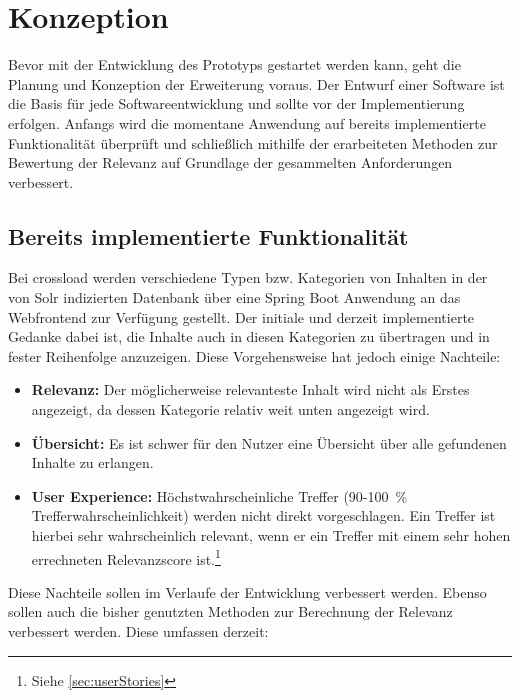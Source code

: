 \chapter{Konzeption}
\label{ch:conception}
Bevor mit der Entwicklung des Prototyps gestartet werden kann, geht die Planung und Konzeption der Erweiterung voraus.
Der Entwurf einer Software ist die Basis für jede Softwareentwicklung und sollte vor der Implementierung erfolgen.
Anfangs wird die momentane Anwendung auf bereits implementierte Funktionalität überprüft und schließlich mithilfe der erarbeiteten Methoden zur Bewertung der Relevanz auf Grundlage der gesammelten Anforderungen verbessert.

\section{Bereits implementierte Funktionalität}
\label{sec:implementedFunctionality}
Bei \gls{crossload} werden verschiedene Typen bzw. Kategorien von Inhalten in der von Solr indizierten Datenbank über eine Spring Boot Anwendung an das Webfrontend zur Verfügung gestellt.
Der initiale und derzeit implementierte Gedanke dabei ist, die Inhalte auch in diesen Kategorien zu übertragen und in fester Reihenfolge anzuzeigen.
Diese Vorgehensweise hat jedoch einige Nachteile:

\begin{itemize}
  \item \textbf{Relevanz:} Der möglicherweise relevanteste Inhalt wird nicht als Erstes angezeigt, da dessen Kategorie relativ weit unten angezeigt wird.
  \item \textbf{Übersicht:} Es ist schwer für den Nutzer eine Übersicht über alle gefundenen Inhalte zu erlangen.
  \item \textbf{User Experience:} Höchstwahrscheinliche Treffer (90-100 \% Trefferwahrscheinlichkeit) werden nicht direkt vorgeschlagen.
  Ein Treffer ist hierbei sehr wahrscheinlich relevant, wenn er ein Treffer mit einem sehr hohen errechneten Relevanzscore ist.\footnote{Siehe \ref{sec:userStories}}
\end{itemize}

Diese Nachteile sollen im Verlaufe der Entwicklung verbessert werden.
Ebenso sollen auch die bisher genutzten Methoden zur Berechnung der Relevanz verbessert werden.
Diese umfassen derzeit:

